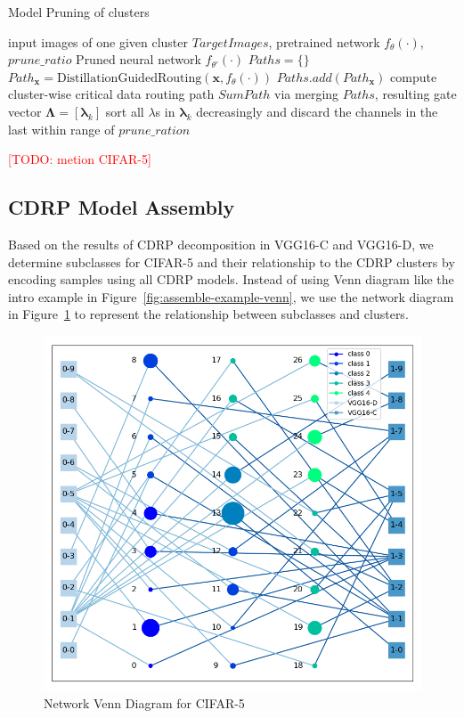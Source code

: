 \documentclass[sigplan,10pt,review]{acmart}\settopmatter{printfolios=true,printccs=false,printacmref=false}
\newcommand{\todo}[1]{\textcolor{red}{[TODO: #1]}}
\begin{document}
\begin{algorithm}
	\caption{Model Pruning of clusters}
	\label{alg:prune}
	\begin{algorithmic}[1]
		\Require input images of one given cluster $TargetImages$, pretrained network $f_\theta(\cdot)$, $prune\_ratio$
		\Ensure Pruned neural network $f_{\theta'}(\cdot)$
		\State $Paths = \{\}$
			\State $Path_{\boldsymbol{x}} = \mathrm{DistillationGuidedRouting}(\boldsymbol{x}, f_\theta(\cdot))$
			\State $Paths.add(Path_{\boldsymbol{x}})$
		\EndFor		
		\State compute cluster-wise critical data routing path $SumPath$ via merging $Paths$, resulting gate vector $\boldsymbol{\Lambda} = [\boldsymbol{\lambda}_k]$
			\State sort all $\lambda$s in $\boldsymbol{\lambda}_k$ decreasingly and discard the channels in the last within range of $prune\_ration$
		\EndFor
	\end{algorithmic}
\end{algorithm}




\todo{metion CIFAR-5}
\subsection{CDRP Model Assembly}
Based on the results of CDRP decomposition in VGG16-C and VGG16-D, we determine subclasses for CIFAR-5 and their relationship to the CDRP clusters by encoding samples using all CDRP models.
Instead of using Venn diagram like the intro example in Figure~\ref{fig:assemble-example-venn}, we use the network diagram in Figure~\ref{fig:network-venn} to represent the relationship between subclasses and clusters.

\begin{figure}[h]
	\centering
	\includegraphics[width=\linewidth]{fig/network_venn.png}
	\caption{Network Venn Diagram for CIFAR-5}
	\label{fig:network-venn}
\end{figure}
\end{document}
